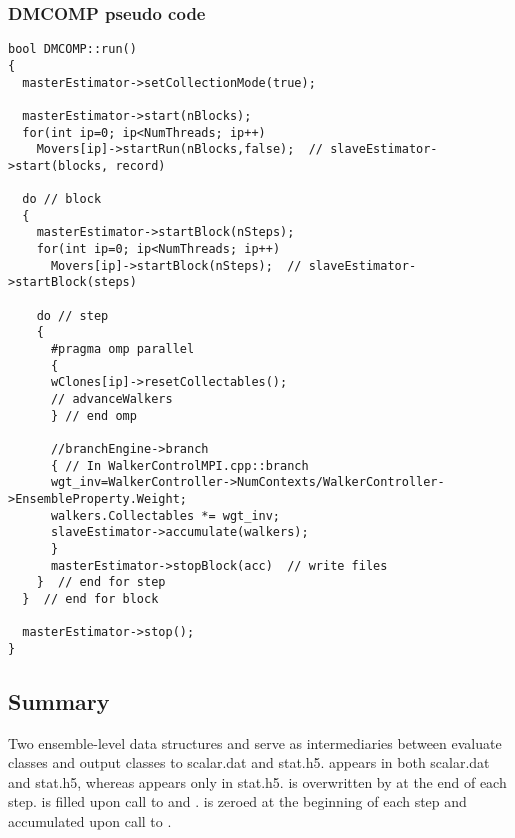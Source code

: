 \subsubsection{DMCOMP  pseudo code}
\begin{lstlisting}
bool DMCOMP::run()
{
  masterEstimator->setCollectionMode(true);
  
  masterEstimator->start(nBlocks);
  for(int ip=0; ip<NumThreads; ip++)
    Movers[ip]->startRun(nBlocks,false);  // slaveEstimator->start(blocks, record)
  
  do // block
  {
    masterEstimator->startBlock(nSteps);
    for(int ip=0; ip<NumThreads; ip++)
      Movers[ip]->startBlock(nSteps);  // slaveEstimator->startBlock(steps)
    
    do // step
    {
      #pragma omp parallel
      {
      wClones[ip]->resetCollectables();
      // advanceWalkers
      } // end omp
      
      //branchEngine->branch
      { // In WalkerControlMPI.cpp::branch
      wgt_inv=WalkerController->NumContexts/WalkerController->EnsembleProperty.Weight;
      walkers.Collectables *= wgt_inv;
      slaveEstimator->accumulate(walkers);
      }
      masterEstimator->stopBlock(acc)  // write files
    }  // end for step
  }  // end for block
  
  masterEstimator->stop();
}
\end{lstlisting}

\subsection{Summary}

Two ensemble-level data structures  and  serve as intermediaries between evaluate classes and output classes to scalar.dat and stat.h5.  appears in both scalar.dat and stat.h5, whereas  appears only in stat.h5.  is overwritten by  at the end of each step.  is filled upon call to  and .  is zeroed at the beginning of each step and accumulated upon call to .

